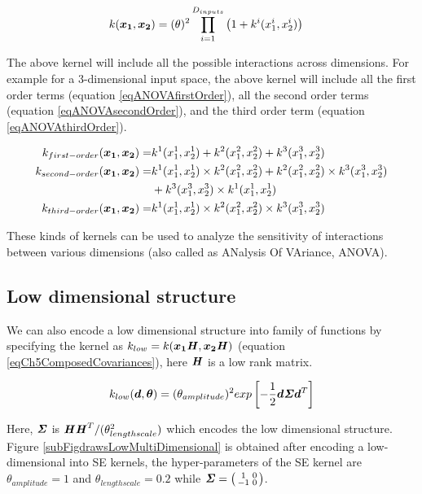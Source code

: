 \begin{align}
k(\boldsymbol{x_{1}}, \boldsymbol{x_{2}}) & = (\theta)^2 \prod_{i=1}^{D_{inputs}} \left(1 + k^{i}(x_{1}^{i}, x_{2}^{i})\right) \label{eqANOVAdecomposition} 
\end{align}

The above kernel will include all the possible interactions across dimensions. For example for a 3-dimensional input space, the above kernel will include all the first order terms (equation \ref{eqANOVAfirstOrder}), all the second order terms (equation \ref{eqANOVAsecondOrder}), and the third order term (equation \ref{eqANOVAthirdOrder}).

\begin{align}
k_{first-order}(\boldsymbol{x_{1}}, \boldsymbol{x_{2}}) =  & k^{1}(x_{1}^{1}, x_{2}^{1}) + k^{2}(x_{1}^{2}, x_{2}^{2}) + k^{3}(x_{1}^{3}, x_{2}^{3})\label{eqANOVAfirstOrder} \\
k_{second-order}(\boldsymbol{x_{1}}, \boldsymbol{x_{2}})  = & k^{1}(x_{1}^{1}, x_{2}^{1}) \times k^{2}(x_{1}^{2}, x_{2}^{2}) + k^{2}(x_{1}^{2}, x_{2}^{2}) \times k^{3}(x_{1}^{3}, x_{2}^{3}) \\ & 
+  k^{3}(x_{1}^{3}, x_{2}^{3}) \times k^{1}(x_{1}^{1}, x_{2}^{1}) \label{eqANOVAsecondOrder} \\
k_{third-order}(\boldsymbol{x_{1}}, \boldsymbol{x_{2}}) = & k^{1}(x_{1}^{1}, x_{2}^{1}) \times k^{2}(x_{1}^{2}, x_{2}^{2}) \times k^{3}(x_{1}^{3}, x_{2}^{3})\label{eqANOVAthirdOrder} \\
\end{align}


These kinds of kernels can be used to analyze the sensitivity of interactions between various dimensions (also called as ANalysis Of VAriance, ANOVA). 

\subsection{Low dimensional structure}
We can also encode a low dimensional structure into family of functions by specifying the kernel as $k_{low} = k(\boldsymbol{x_{1}}\bm{\mathit{H}}, \boldsymbol{x_{2}}\bm{\mathit{H}})$ (equation \ref{eqCh5ComposedCovariances}), here $\bm{\mathit{H}}$ is a low rank matrix. 

\begin{align}\label{eq:SELowDimensional}
k_{low}(\boldsymbol{d}, \boldsymbol{\theta}) = (\theta_{amplitude})^2  exp\left [  -\frac{1}{2} \boldsymbol{d} \bm{\mathit{\Sigma}} \boldsymbol{d}^T \right ] 
\end{align}

Here, $\bm{\mathit{\Sigma}}$ is $\bm{\mathit{H}}\bm{\mathit{H}}^T/(\theta_{lengthscale}^2)$ which encodes the low dimensional structure. Figure \ref{subFigdrawsLowMultiDimensional} is obtained after encoding a low-dimensional into SE kernels, the hyper-parameters of the SE kernel are $\theta_{amplitude}=1$ and $\theta_{lengthscale}=0.2$ while $\bm{\mathit{\Sigma}} = \bigl( \begin{smallmatrix} 1 & 0\\ -1 & 0\end{smallmatrix}\bigr)$. 

